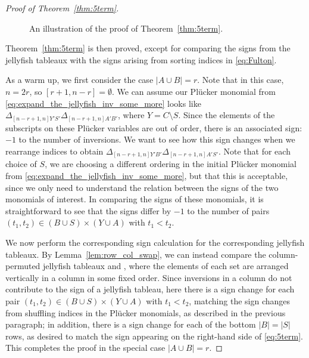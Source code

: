 \documentclass[ALCO, Unicode]{cedram}
\numberwithin{equation}{section}
\begin{document}
\begin{proof}[Proof of Theorem~\ref{thm:5term}]
\begin{figure}[htb]
    \centering
    \caption{An illustration of the proof of Theorem~\ref{thm:5term}.}
    \label{fig:jellyfish_sign_calc}
\end{figure}

Theorem~\ref{thm:5term} is then proved, except for comparing the signs from the jellyfish tableaux with the signs arising from sorting indices in \eqref{eq:Fulton}. 

As a warm up, we first consider the case $|A \cup B| = r$. Note that in this case, $n=2r$, so $[r+1,n-r]=\emptyset$.  We can assume our  Pl\"ucker monomial from \eqref{eq:expand_the_jellyfish_inv_some_more} looks like $\Delta_{[n-r+1,n]  Y'S'}\Delta_{[n-r+1,n]  A'B'}$, where $Y = C \setminus S$. Since the elements of the subscripts on these Pl\"ucker variables are out of order, there is an associated sign: $-1$ to the number of inversions. We want to see how this sign changes when we rearrange indices to obtain $\Delta_{[n-r+1,n]  Y'B'} \Delta_{[n-r+1,n]  A'S'}$.  Note that for each choice of $S$, we are choosing a different ordering in the initial Pl\"ucker monomial from \eqref{eq:expand_the_jellyfish_inv_some_more}, but that this is acceptable, since we only need to understand the relation between the signs of the two monomials of interest. In comparing the signs of these monomials, it is straightforward to see that the signs differ by $-1$ to the number of pairs $(t_1, t_2) \in (B \cup S) \times (Y \cup A)$ with $t_1 < t_2$.

We now perform the corresponding sign calculation for the corresponding jellyfish tableaux.
By Lemma~\ref{lem:row_col_swap}, we can instead compare the column-permuted jellyfish tableaux 
 and  , where the elements of each set are arranged vertically in a column in some fixed order. Since inversions in a column do not contribute to the sign of a jellyfish tableau, here there is a sign change for each pair $(t_1, t_2) \in (B \cup S) \times (Y \cup A)$ with $t_1 < t_2$, matching the sign changes from shuffling indices in the Pl\"ucker monomials, as described in the previous paragraph; in addition, there is a sign change for each of the bottom $|B| = |S|$ rows, as desired to match the sign appearing on the right-hand side of \eqref{eq:5term}. This completes the proof in the special case $|A \cup B| = r$.


\end{proof}
\end{document}
